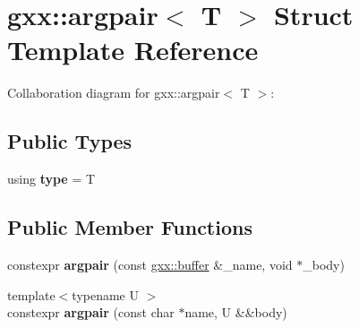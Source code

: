 \hypertarget{classgxx_1_1argpair}{}\section{gxx\+:\+:argpair$<$ T $>$ Struct Template Reference}
\label{classgxx_1_1argpair}


Collaboration diagram for gxx\+:\+:argpair$<$ T $>$\+:
\subsection*{Public Types}
\begin{DoxyCompactItemize}
\item 
using {\bfseries type} = T\hypertarget{classgxx_1_1argpair_a313a7427a6e4731dc2670f45aa41a5c0}{}\label{classgxx_1_1argpair_a313a7427a6e4731dc2670f45aa41a5c0}

\end{DoxyCompactItemize}
\subsection*{Public Member Functions}
\begin{DoxyCompactItemize}
\item 
constexpr {\bfseries argpair} (const \hyperlink{classgxx_1_1buffer}{gxx\+::buffer} \&\+\_\+name, void $\ast$\+\_\+body)\hypertarget{classgxx_1_1argpair_a0b82346ee3a5d25f0fd72b6be1e1cdd7}{}\label{classgxx_1_1argpair_a0b82346ee3a5d25f0fd72b6be1e1cdd7}

\item 
{\footnotesize template$<$typename U $>$ }\\constexpr {\bfseries argpair} (const char $\ast$name, U \&\&body)\hypertarget{classgxx_1_1argpair_aa8f02dc6696b89d6c26f8ac10eb965a8}{}\label{classgxx_1_1argpair_aa8f02dc6696b89d6c26f8ac10eb965a8}

\end{DoxyCompactItemize}
